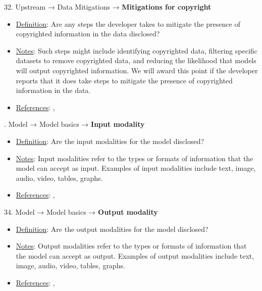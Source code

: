 32. Upstream → Data Mitigations → \textbf{Mitigations for copyright}
\vspace{-\parskip}
\begin{itemize}
\item
\underline{Definition}: Are any steps the developer takes to mitigate the presence of copyrighted information in the data disclosed?
\item
\underline{Notes}: Such steps might include identifying copyrighted data, filtering specific datasets to remove copyrighted data, and reducing the likelihood that models will output copyrighted information. We will award this point if the developer reports that it does take steps to mitigate the presence of copyrighted information in the data.
\item
\underline{References}: \citet{bandy2021addressing}, \citet{genlaw2023}
\end{itemize}


. Model → Model basics → \textbf{Input modality}
\vspace{-\parskip}
\begin{itemize}
\item
\underline{Definition}: Are the input modalities for the model disclosed?
\item
\underline{Notes}: Input modalities refer to the types or formats of information that the model can accept as input. Examples of input modalities include text, image, audio, video, tables, graphs.
\item
\underline{References}: \citet{mitchell2019model}, \citet{crisan2022interactive}
\end{itemize}


34. Model → Model basics → \textbf{Output modality}
\vspace{-\parskip}
\begin{itemize}
\item
\underline{Definition}: Are the output modalities for the model disclosed?
\item
\underline{Notes}: Output modalities refer to the types or formats of information that the model can accept as output. Examples of output modalities include text, image, audio, video, tables, graphs.
\item
\underline{References}: \citet{mitchell2019model}, \citet{crisan2022interactive}
\end{itemize}


